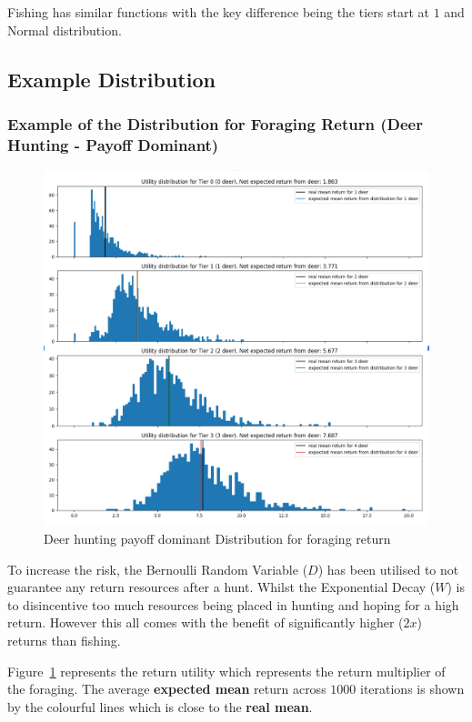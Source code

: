 Fishing has similar functions with the key difference being the tiers start at $1$ and Normal distribution.

\newpage
\subsection{Example Distribution}
\subsubsection{Example of the Distribution for Foraging Return (Deer Hunting - Payoff Dominant)}

\begin{figure}[!htb]
    \centering
    \includegraphics[width=1\textwidth]{04_environment/Images/Distribution of Foraging returns Deer Hunting.PNG}
    \caption{Deer hunting payoff dominant Distribution for foraging return}
    \label{fig:Distribution of Foraging returns Deer Hunting}
\end{figure}

To increase the risk, the Bernoulli Random Variable ($D$) has been utilised to not guarantee any return resources after a hunt. Whilst the Exponential Decay ($W$) is to disincentive too much resources being placed in hunting and hoping for a high return. However this all comes with the benefit of significantly higher ($2x$) returns than fishing.

Figure~\ref{fig:Distribution of Foraging returns Deer Hunting} represents the return utility which represents the return multiplier of the foraging. The average \textbf{expected mean} return across $1000$ iterations is shown by the colourful lines which is close to the \textbf{real mean}.

